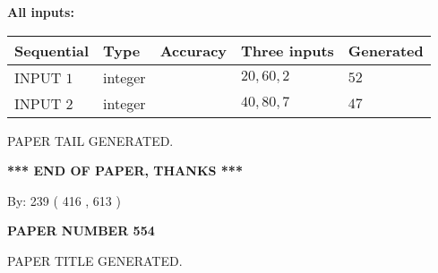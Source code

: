 \documentclass{ctexart}
\begin{document}
   
   
   
\noindent\vspace{0.1in}\hspace{-0.08in} {\textbf{\Large{All inputs: }}}
   
   
  
  
\noindent\begin{tabular}{|l|l|l|l|l|}
\hline
 Sequential & Type & Accuracy & Three inputs & Generated \\ 
\hline
 
 
  INPUT $  1 $ & integer &  & $
 20
 , 
 60
 , 
 2
 $ & $ 52 $ 
 \\  \hline  
 
 
  INPUT $  2 $ & integer &  & $
 40
 , 
 80
 , 
 7
 $ & $ 47 $ 
 \\  \hline  
 \end{tabular}
   
   
   
   
   
   
 \vspace{0.2in}
 
   
   
\vspace{2.0in} PAPER TAIL GENERATED.
   
   
   
   
\vspace{1.0in} 
{\textbf{\large{ *** END OF PAPER, THANKS *** }}} 
   
   
\hspace{1.0in} By: 
 239 ( 416 ,  613 )
   
   
   
   
\newpage 
\setcounter{page}{ 
   554001 } 
   
   
   
   
 {\textbf{ \Large{ PAPER NUMBER  554  }}}
   
   
\vspace{0.2in}
   
   
   
   
   
   
   
   
 \vspace{0.2in}
 
 
 
 
   
   
 PAPER TITLE GENERATED.
   
   
   
\vspace{0.2in}
   
\end{document}
